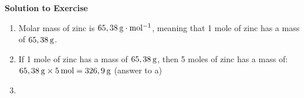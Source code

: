 {\begin{mdframed}[linewidth=4, leftmargin=40, rightmargin=40]
\begin{exercise}
      
      \vspace{5pt}
      \label{m38717*solfhsst!!!underscore!!!id269}\noindent\textbf{Solution to Exercise } \label{m38717*listfhsst!!!underscore!!!id269}\begin{enumerate}[noitemsep, label=\textbf{Step} \textbf{\arabic*}. ] 
            \leftskip=20pt\rightskip=\leftskip\item  
      \label{m38717*id276984}Molar mass of zinc is \begin{math}65,38\phantom{\rule{2pt}{0ex}}\mathrm{g}\ensuremath{\cdot}\mathrm{mol}{}^{-1}\end{math}, meaning that 1 mole of zinc has a mass of \begin{math}65,38\phantom{\rule{2pt}{0ex}}\mathrm{g}\end{math}.
 \par 
      \item  
      \label{m38717*id277021}If 1 mole of zinc has a mass of \begin{math}65,38\phantom{\rule{2pt}{0ex}}\mathrm{g}\end{math}, then 5 moles of zinc has a mass of: \begin{math}65,38\phantom{\rule{2pt}{0ex}}\mathrm{g}\ensuremath{\times}5\phantom{\rule{2pt}{0ex}}\mathrm{mol}=326,9\phantom{\rule{2pt}{0ex}}\mathrm{g}\end{math} (answer to a)\par 
      \item  
      \label{m38717*id277035}\nopagebreak\noindent{}
    

\end{enumerate}
\end{exercise}
\end{mdframed}}
